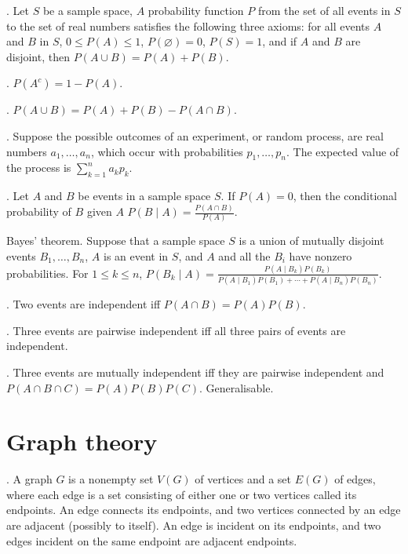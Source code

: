 \documentclass{slnotes}
\begin{document}
. Let \(S\) be a sample space, \(A\) probability function \(P\) from the set of all events in \(S\) to the set of real numbers satisfies the following three axioms: for all events \(A\) and \(B\) in \(S\), \(0 \le P(A) \le 1\), \(P(\varnothing) = 0\), \(P(S) = 1\), and if \(A\) and \(B\) are disjoint, then \(P(A \cup B) = P(A) + P(B)\).

. \(P(A^c) = 1 - P(A)\).

. \(P(A \cup B) = P(A) + P(B) - P(A \cap B)\).

. Suppose the possible outcomes of an experiment, or random process, are real numbers \(a_1, \hdots, a_n\), which occur with probabilities \(p_1, \hdots, p_n\). The
expected value of the process is \(\sum^n_{k=1}a_kp_k\).

. Let \(A\) and \(B\) be events in a sample space \(S\). If \(P(A) = 0\), then the conditional probability of \(B\) given \(A\) \(P(B \mid A) = \frac{P(A \cap B)}{P(A)}\).

 Bayes' theorem. Suppose that a sample space \(S\) is a union of mutually disjoint events \(B_1, \hdots, B_n\), \(A\) is an event in \(S\), and \(A\) and all the \(B_i\) have nonzero probabilities. For \(1 \le k \le n\), \(P(B_k \mid A) = \frac{P(A \mid B_k)P(B_k)}{P(A \mid B_1)P(B_1) + \cdots + P(A \mid B_n)P(B_n)}\).

. Two events are independent iff \(P(A \cap B) = P(A)P(B)\).

. Three events are pairwise independent iff all three pairs of events are independent.

. Three events are mutually independent iff they are pairwise independent and \(P(A \cap B \cap C) = P(A)P(B)P(C)\). Generalisable.

\chapter{Graph theory}
. A graph \(G\) is a nonempty set \(V(G)\) of vertices and a set \(E(G)\) of edges, where each edge is a set consisting of either one or two vertices called its endpoints. An edge connects its endpoints, and two vertices connected by an edge are adjacent (possibly to itself). An edge is incident on its endpoints, and two edges incident on the same endpoint are adjacent endpoints.
\end{document}
